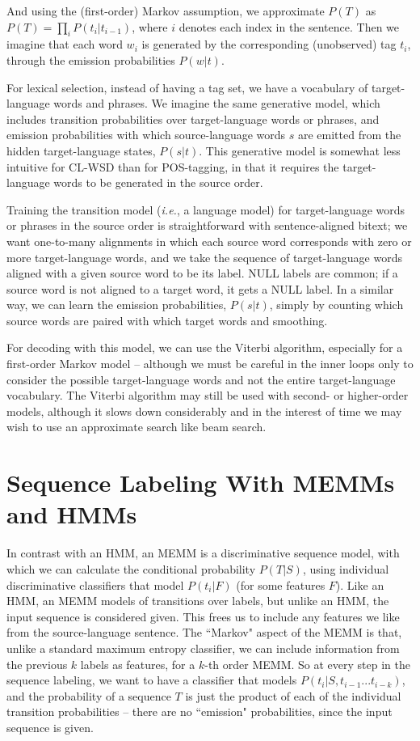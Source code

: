 \documentclass[11pt]{article}
\begin{document}
And using the (first-order) Markov assumption, we approximate $P(T)$ as 
$P(T) = \prod_{i} P(t_i | t_{i-1})$, where $i$ denotes each index in the
sentence. Then we imagine that each word $w_i$ is generated by the
corresponding (unobserved) tag $t_i$, through the emission probabilities
$P(w|t)$.

For lexical selection, instead of having a tag set, we have a vocabulary of
target-language words and phrases. We imagine the same generative model, which
includes transition probabilities over target-language words or phrases, and
emission probabilities with which source-language words $s$ are emitted from
the hidden target-language states, $P(s|t)$. This generative model is somewhat
less intuitive for CL-WSD than for POS-tagging, in that it requires the
target-language words to be generated in the source order.

Training the transition model (\textit{i.e.}, a language model) for
target-language words or phrases in the source order is straightforward with
sentence-aligned bitext; we want one-to-many alignments in which each source
word corresponds with zero or more target-language words, and we take the
sequence of target-language words aligned with a given source word to be its
label. NULL labels are common; if a source word is not aligned to a target
word, it gets a NULL label. In a similar way, we can learn the emission
probabilities, $P(s|t)$, simply by counting which source words are paired with
which target words and smoothing.

For decoding with this model, we can use the Viterbi algorithm, especially for
a first-order Markov model -- although we must be careful in the inner loops
only to consider the possible target-language words and not the entire
target-language vocabulary. The Viterbi algorithm may still be used with
second- or higher-order models, although it slows down considerably and in the
interest of time we may wish to use an approximate search like beam search.

\section{Sequence Labeling With MEMMs and HMMs}
In contrast with an HMM, an MEMM is a discriminative sequence model, with
which we can calculate the conditional probability $P(T|S)$, using individual
discriminative classifiers that model $P(t_i | F)$ (for some features $F$).
Like an HMM, an MEMM models of transitions over labels, but unlike an HMM, the
input sequence is considered given. This frees us to include any features we
like from the source-language sentence. The ``Markov" aspect of the MEMM is
that, unlike a standard maximum entropy classifier, we can include information
from the previous $k$ labels as features, for a $k$-th order MEMM. So at every
step in the sequence labeling, we want to have a classifier that models 
$P(t_i | S, t_{i-1}...t_{i-k})$, and the probability of a sequence $T$ is just
the product of each of the individual transition probabilities -- there are no
``emission" probabilities, since the input sequence is given.
\end{document}
